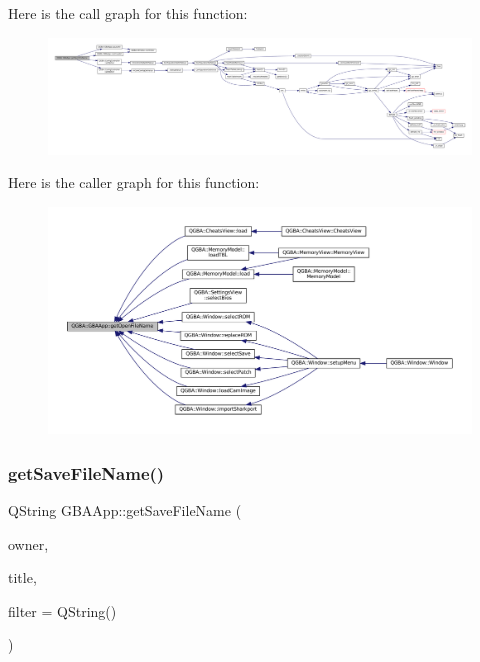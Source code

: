 Here is the call graph for this function\+:
\nopagebreak
\begin{figure}[H]
\begin{center}
\leavevmode
\includegraphics[width=350pt]{class_q_g_b_a_1_1_g_b_a_app_a44b0a376cc16d17e904f5d750a854380_cgraph}
\end{center}
\end{figure}
Here is the caller graph for this function\+:
\nopagebreak
\begin{figure}[H]
\begin{center}
\leavevmode
\includegraphics[width=350pt]{class_q_g_b_a_1_1_g_b_a_app_a44b0a376cc16d17e904f5d750a854380_icgraph}
\end{center}
\end{figure}
\mbox{\label{class_q_g_b_a_1_1_g_b_a_app_a9a8900559fe370b6143a0f4be535fa16}} 
\subsubsection{\texorpdfstring{get\+Save\+File\+Name()}{getSaveFileName()}}
{\footnotesize\ttfamily Q\+String G\+B\+A\+App\+::get\+Save\+File\+Name (\begin{DoxyParamCaption}\item[{Q\+Widget $\ast$}]{owner,  }\item[{const Q\+String \&}]{title,  }\item[{const Q\+String \&}]{filter = {\ttfamily QString()} }\end{DoxyParamCaption})}


